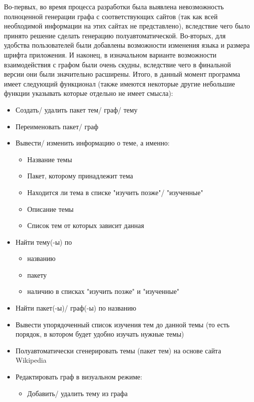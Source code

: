 \documentclass[a4paper,14pt]{extarticle}
\begin{document}
Во-первых, во время процесса разработки была выявлена невозможность
полноценной генерации графа с соответствующих сайтов (так как всей необходимой
информации на этих сайтах не представлено), вследствие чего было принято
решение сделать генерацию полуавтоматической. Во-вторых, для удобства
пользователей были добавлены возможности изменения языка и размера шрифта
приложения. И наконец, в изначальном варианте возможности взаимодействия с
графом были очень скудны, вследствие чего в финальной версии они были
значительно расширены. Итого, в данный момент программа имеет следующий
функционал (также имеются некоторые другие небольшие функции указывать которые
отдельно не имеет смысла):

\begin{itemize}
    \item Создать/ удалить пакет тем/ граф/ тему
    \item Переименовать пакет/ граф
    \item Вывести/ изменить информацию о теме, а именно:
    \begin{itemize}
        \item Название темы
        \item Пакет, которому принадлежит тема
        \item Находится ли тема в списке "изучить позже"/ "изученные"
        \item Описание темы
        \item Список тем от которых зависит данная
    \end{itemize}
    \item Найти тему(-ы) по
    \begin{itemize}
        \item названию
        \item пакету
        \item наличию в списках "изучить позже" и "изученные"
    \end{itemize}
    \item Найти пакет(-ы)/ граф(-ы) по названию
    \item Вывести упорядоченный список изучения тем до данной темы (то есть порядок,
      в котором будет удобно изучать нужные темы)
    \item Полуавтоматически сгенерировать темы (пакет тем) на основе сайта Wikipedia
    \item Редактировать граф в визуальном режиме:
    \begin{itemize}
        \item Добавить/ удалить тему из графа

\end{itemize}
\end{itemize}
\end{document}

